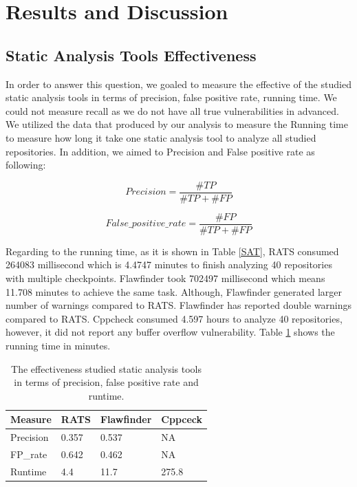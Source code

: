 \section{Results and Discussion}

\subsection{Static Analysis Tools Effectiveness}
In order to answer this question, we goaled to measure the effective of the studied static analysis tools in terms of precision, false positive rate, running time. We could not measure recall as we do not have all true vulnerabilities in advanced. We utilized the data that produced by our analysis to measure the Running time to measure how long it take one static analysis tool to analyze all studied repositories. In addition, we aimed to Precision and False positive rate as following: 

\begin{equation}
Precision = \frac  {\#TP}{\#TP + \#FP}
\end{equation}


\begin{equation}
False\_positive\_rate = \frac  {\#FP}{\#TP + \#FP}
\end{equation}


Regarding to the running time, as it is shown in Table \ref{SAT}, RATS consumed  264083 millisecond  which is 4.4747 minutes to finish analyzing 40 repositories with multiple checkpoints. Flawfinder took 702497 millisecond which means 11.708 minutes to achieve the same task. Although, Flawfinder generated larger number of warnings compared to RATS. Flawfinder has reported double warnings compared to RATS. Cppcheck consumed  4.597 hours to analyze 40 repositories, however, it did not report any buffer overflow vulnerability.  Table \ref{eff} shows the running time in minutes.



\begin{table}[ht]
\centering
\scriptsize
\caption{The effectiveness studied static analysis tools in terms of precision, false positive rate and runtime.}
\label{eff}
\begin{tabular}{||p{1cm}|p{2cm} p{2cm} p{2cm}||}
\hline
\textbf{Measure} & \textbf{RATS} &	 \textbf{Flawfinder} 	& \textbf{Cppceck} 	\\
\hline\hline
Precision & 0.357&0.537& NA\\
FP\_rate & 0.642 &0.462& NA\\
Runtime & 4.4 & 11.7 &275.8\\
\hline
\end{tabular}
\end{table}

